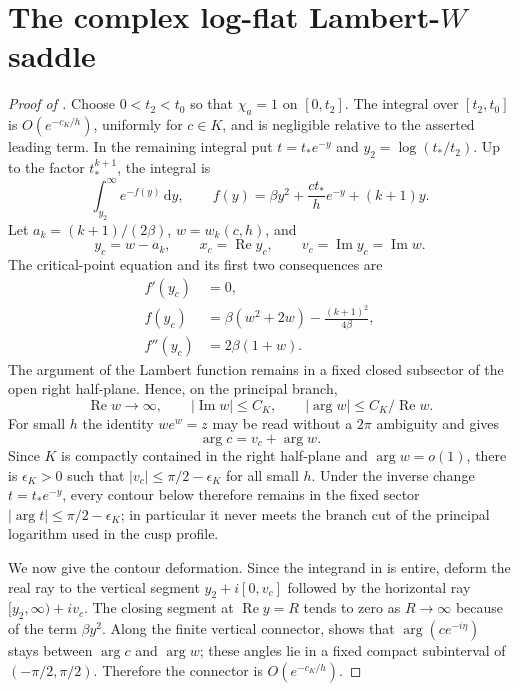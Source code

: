 \documentclass[11pt]{article}
\newcommand{\dd}{\,\mathrm d}
\newcommand{\Rea}{\operatorname{Re}}
\newcommand{\Ima}{\operatorname{Im}}
\begin{document}
\section{The complex log-flat \texorpdfstring{Lambert-$W$}{Lambert-W} saddle}\label{app:lambert-saddle}
\begin{proof}[Proof of ]
Choose $0<t_2<t_0$ so that $\chi_a=1$ on $[0,t_2]$.  The integral over
$[t_2,t_0]$ is $O(e^{-c_K/h})$, uniformly for $c\in K$, and is negligible
relative to the asserted leading term.  In the remaining integral put
$t=t_*e^{-y}$ and $y_2=\log(t_*/t_2)$.  Up to the factor $t_*^{k+1}$, the
integral is
\begin{equation}\label{eq:y-integral}
 \int_{y_2}^{\infty}e^{-f(y)}\dd y,
 \qquad
 f(y)=\beta y^2+\frac{ct_*}{h}e^{-y}+(k+1)y.
\end{equation}
Let $a_k=(k+1)/(2\beta)$, $w=w_k(c,h)$, and
\[
 y_c=w-a_k,
 \qquad x_c=\Rea y_c,
 \qquad v_c=\Ima y_c=\Ima w.
\]
The critical-point equation and its first two consequences are
\begin{align}
 f'(y_c)&=0,\label{eq:yc}\\
 f(y_c)&=\beta(w^2+2w)-\frac{(k+1)^2}{4\beta},
 \label{eq:fc}\\
 f''(y_c)&=2\beta(1+w).
 \label{eq:f2c}
\end{align}
The argument of the Lambert function remains in a fixed closed subsector of
the open right half-plane.  Hence, on the principal branch,
\begin{equation}\label{eq:w-sector-properties}
 \Rea w\longrightarrow\infty,
 \qquad |\Ima w|\le C_K,
 \qquad |\arg w|\le C_K/\Rea w.
\end{equation}
For small $h$ the identity $we^w=z$ may be read without a $2\pi$ ambiguity
and gives
\begin{equation}\label{eq:arg-relation}
 \arg c=v_c+\arg w.
\end{equation}
Since $K$ is compactly contained in the right half-plane and
$\arg w=o(1)$, there is $\epsilon_K>0$ such that
$|v_c|\le\pi/2-\epsilon_K$ for all small $h$.  Under the inverse change
$t=t_*e^{-y}$, every contour below therefore remains in the fixed sector
$|\arg t|\le\pi/2-\epsilon_K$; in particular it never meets the branch
cut of the principal logarithm used in the cusp profile.

We now give the contour deformation.  Since the integrand in
 is entire, deform the real ray to the vertical segment
$y_2+i[0,v_c]$ followed by the horizontal ray
$[y_2,\infty)+iv_c$.  The closing segment at $\Rea y=R$ tends to zero as
$R\to\infty$ because of the term $\beta y^2$.  Along the finite vertical
connector,  shows that
$\arg(ce^{-i\eta})$ stays between $\arg c$ and $\arg w$; these angles lie in
a fixed compact subinterval of $(-\pi/2,\pi/2)$.  Therefore the connector is
$O(e^{-c_K/h})$.


\end{proof}
\end{document}
